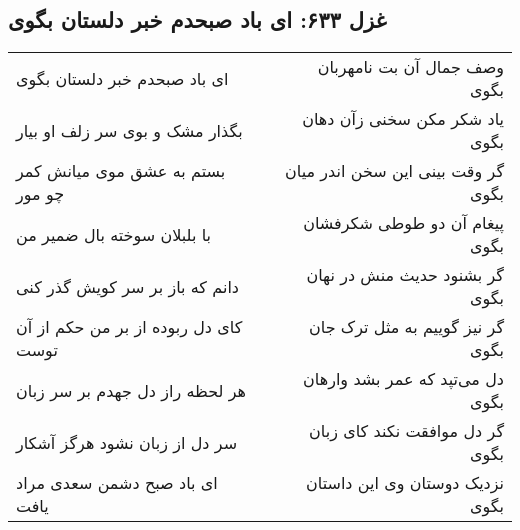 \begin{center}
\section*{غزل ۶۳۳: ای باد صبحدم خبر دلستان بگوی}
\label{sec:633}
\begin{longtable}{l p{0.5cm} r}
ای باد صبحدم خبر دلستان بگوی
&&
وصف جمال آن بت نامهربان بگوی
\\
بگذار مشک و بوی سر زلف او بیار
&&
یاد شکر مکن سخنی زآن دهان بگوی
\\
بستم به عشق موی میانش کمر چو مور
&&
گر وقت بینی این سخن اندر میان بگوی
\\
با بلبلان سوخته بال ضمیر من
&&
پیغام آن دو طوطی شکرفشان بگوی
\\
دانم که باز بر سر کویش گذر کنی
&&
گر بشنود حدیث منش در نهان بگوی
\\
کای دل ربوده از بر من حکم از آن توست
&&
گر نیز گوییم به مثل ترک جان بگوی
\\
هر لحظه راز دل جهدم بر سر زبان
&&
دل می‌تپد که عمر بشد وارهان بگوی
\\
سر دل از زبان نشود هرگز آشکار
&&
گر دل موافقت نکند کای زبان بگوی
\\
ای باد صبح دشمن سعدی مراد یافت
&&
نزدیک دوستان وی این داستان بگوی
\\
\end{longtable}
\end{center}
